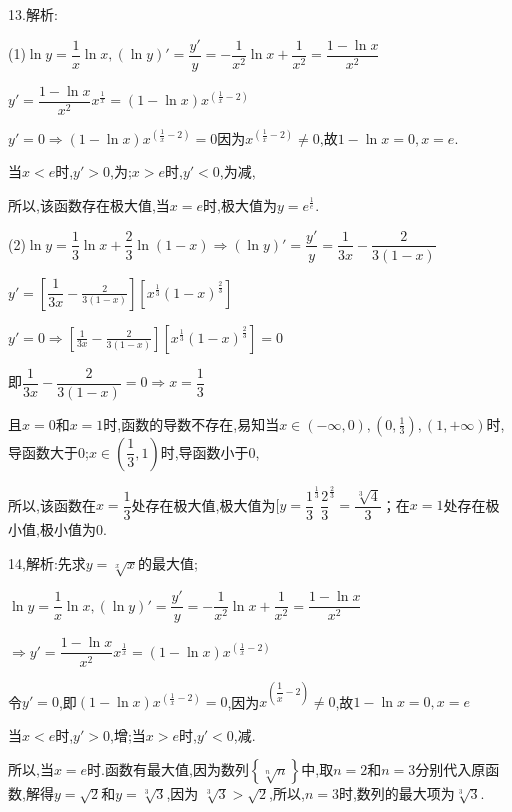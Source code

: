 13.解析:

(1)$\ln y = \dfrac{1}{x}\ln x,(\ln y)' = \dfrac{{y'}}{y} =  - \dfrac{1}{{{x^2}}}\ln x + \dfrac{1}{{{x^2}}} = \dfrac{{1 - \ln x}}{{{x^2}}}$

$y' = \dfrac{{1 - \ln x}}{{{x^2}}}{x^{\frac{1}{x}}} = (1 - \ln x){x^{(\frac{1}{x} - 2)}}$

$y' = 0 \Rightarrow (1 - \ln x){x^{(\frac{1}{x} - 2)}} = 0$因为${x^{(\frac{1}{x} - 2)}} \ne 0$,故$1 - \ln x = 0,x = e$.

当$x < e$时,$y' > 0$,为;$x > e$时,$y' < 0$,为减,

所以,该函数存在极大值,当$x = e$时,极大值为$y = {e^{\frac{1}{e}}}$.

(2)$\ln y = \dfrac{1}{3}\ln x + \dfrac{2}{3}\ln (1 - x) \Rightarrow (\ln y)' = \dfrac{{y'}}{y} = \dfrac{1}{{3x}} - \dfrac{2}{{3(1 - x)}}$

$y' = [\dfrac{1}{{3x}} - \frac{2}{{3(1 - x)}}][{x^{\frac{1}{3}}}{(1 - x)^{\frac{2}{3}}}]$

$y' = 0 \Rightarrow [\frac{1}{{3x}} - \frac{2}{{3(1 - x)}}][{x^{\frac{1}{3}}}{(1 - x)^{\frac{2}{3}}}] = 0$

即$\dfrac{1}{{3x}} - \dfrac{2}{{3(1 - x)}} = 0 \Rightarrow x = \dfrac{1}{3}$

且$x = 0$和$x = 1$时,函数的导数不存在,易知当$x \in ( - \infty ,0),(0,\frac{1}{3}),(1, + \infty )$时,导函数大于0;$x \in (\dfrac{1}{3},1)$时,导函数小于0,

所以,该函数在$x = \dfrac{1}{3}$处存在极大值,极大值为$[y = {\dfrac{1}{3}^{\frac{1}{3}}}{\dfrac{2}{3}^{\frac{2}{3}}} = \dfrac{{\sqrt[3]{4}}}{3}$；在$x = 1$处存在极小值,极小值为0.

14,解析:先求$y = \sqrt[x]{x}$的最大值;

$\ln y = \dfrac{1}{x}\ln x,(\ln y)' = \dfrac{{y'}}{y} =  - \dfrac{1}{{{x^2}}}\ln x + \dfrac{1}{{{x^2}}} = \dfrac{{1 - \ln x}}{{{x^2}}}$

$ \Rightarrow y' = \dfrac{{1 - \ln x}}{{{x^2}}}{x^{\frac{1}{x}}} = (1 - \ln x){x^{(\frac{1}{x} - 2)}}$

令$y' = 0$,即$(1 - \ln x){x^{(\frac{1}{x} - 2)}} = 0$,因为${x^{(\dfrac{1}{x} - 2)}} \ne 0$,故$1 - \ln x = 0,x = e$

当$x < e$时,$y' > 0$,增;当$x > e$时,$y' < 0$,减.

所以,当$x = e$时.函数有最大值,因为数列$\left\{ {\sqrt[n]{n}} \right\}$中,取$n = 2$和$n = 3$分别代入原函数,解得$y = \sqrt 2 $和$y = \sqrt[3]{3}$,因为 $\sqrt[3]{3} > \sqrt 2 $,所以,$n = 3$时,数列的最大项为$\sqrt[3]{3}$.

